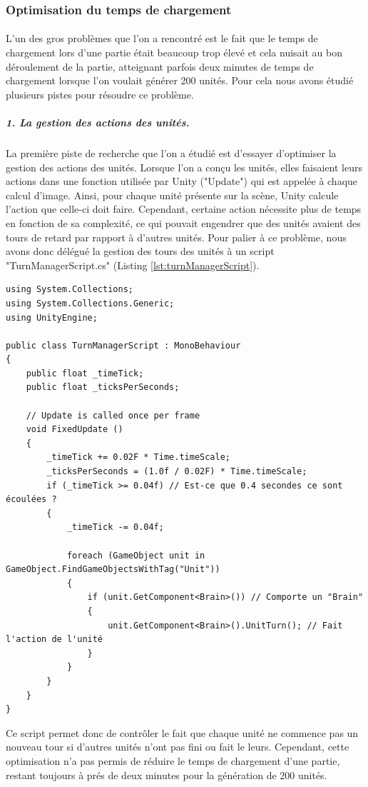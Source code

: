 \documentclass{report}
\begin{document}
\subsubsection{Optimisation du temps de chargement}
\paragraph{} L'un des gros problèmes que l'on a rencontré est le fait que le temps de chargement lors d'une partie était beaucoup trop élevé et cela nuisait au bon déroulement de la partie, atteignant parfois deux minutes de temps de chargement lorsque l'on voulait générer 200 unités. Pour cela nous avons étudié plusieurs pistes pour résoudre ce problème.
\subparagraph{1. La gestion des actions des unités.}La première piste de recherche que l'on a étudié est d'essayer d'optimiser la gestion des actions des unités. Lorsque l'on a conçu les unités, elles faisaient leurs actions dans une fonction utilisée par Unity ("Update") qui est appelée à chaque calcul d'image. Ainsi, pour chaque unité présente sur la scène, Unity calcule l'action que celle-ci doit faire. Cependant, certaine action nécessite plus de temps en fonction de sa complexité, ce qui pouvait engendrer que des unités avaient des tours de retard par rapport à d'autres unités. \newline
Pour palier à ce problème, nous avons donc délégué la gestion des tours des unités à un script  "TurnManagerScript.cs" (Listing \ref{lst:turnManagerScript}).\newline
 \begin{lstlisting}[language={[Sharp]C},label={lst:turnManagerScript}, caption= Code du script TurnManagerScript.cs]
using System.Collections;
using System.Collections.Generic;
using UnityEngine;

public class TurnManagerScript : MonoBehaviour
{
    public float _timeTick;
    public float _ticksPerSeconds;
    
    // Update is called once per frame
	void FixedUpdate ()
    {
        _timeTick += 0.02F * Time.timeScale;
        _ticksPerSeconds = (1.0f / 0.02F) * Time.timeScale;
        if (_timeTick >= 0.04f) // Est-ce que 0.4 secondes ce sont écoulées ?
        {
            _timeTick -= 0.04f;

            foreach (GameObject unit in GameObject.FindGameObjectsWithTag("Unit"))
            {
                if (unit.GetComponent<Brain>()) // Comporte un "Brain"
                {
                    unit.GetComponent<Brain>().UnitTurn(); // Fait l'action de l'unité
                }
            }
        }
	}
}
\end{lstlisting}
Ce script permet donc de contrôler le fait que chaque unité ne commence pas un nouveau tour si d'autres unités n'ont pas fini ou fait le leurs.
Cependant, cette optimisation n'a pas permis de réduire le temps de chargement d'une partie, restant toujours à prés de deux minutes pour la génération de 200 unités.
\end{document}
